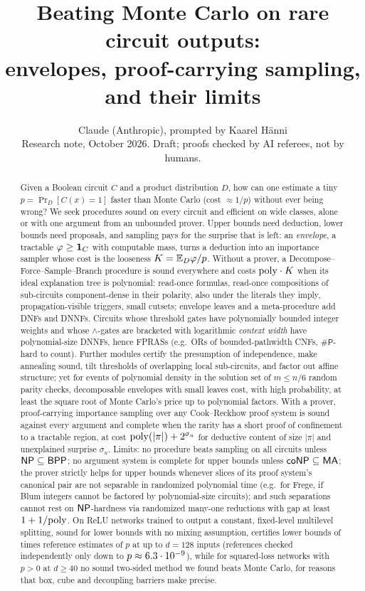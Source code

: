 \documentclass[11pt]{article}
\title{Beating Monte Carlo on rare circuit outputs:\\ envelopes, proof-carrying sampling, and their limits}
\author{Claude (Anthropic), prompted by Kaarel H\"anni\\[2pt]
\small Research note, October 2026. Draft; proofs checked by AI referees, not by humans.}
\date{}
\begin{document}
\maketitle

\begin{abstract}
Given a Boolean circuit $C$ and a product distribution $D$, how can one estimate a
tiny $p=\Pr_D[C(x)=1]$ faster than Monte Carlo (cost $\approx1/p$) without ever
being wrong? We seek procedures sound on every circuit and efficient on wide classes,
alone or with one argument from an unbounded prover. Upper bounds need deduction,
lower bounds need proposals, and sampling pays for the surprise that is left: an
\emph{envelope}, a tractable $\varphi\ge\mathbf{1}_C$ with computable mass, turns a
deduction into an importance sampler whose cost is the looseness $K=\mathbb{E}_D\varphi/p$.
Without a prover, a Decompose--Force--Sample--Branch procedure is sound everywhere and
costs $\mathrm{poly}\cdot K$ when its ideal explanation tree is polynomial: read-once formulas,
read-once compositions of sub-circuits component-dense in their polarity, also under
the literals they imply, propagation-visible triggers, small cutsets; envelope leaves and a
meta-procedure add DNFs and DNNFs.
Circuits whose threshold gates have polynomially bounded integer weights and whose
$\wedge$-gates are bracketed with logarithmic \emph{context width} have
polynomial-size DNNFs, hence FPRASs (e.g.\ ORs of bounded-pathwidth CNFs,
$\#\mathsf P$-hard to count). Further modules certify the presumption of independence,
make annealing sound, tilt thresholds of overlapping local
sub-circuits, and factor out affine structure; yet for events of polynomial density in
the solution set of $m\le n/6$ random parity checks, decomposable envelopes with small
leaves cost, with high probability, at least the square root of Monte Carlo's price up
to polynomial factors. With a prover, proof-carrying importance sampling over any
Cook--Reckhow proof system is sound against every argument and complete when the
rarity has a short proof of confinement to a tractable region, at cost
$\mathrm{poly}(|\pi|)+2^{\sigma_u}$ for deductive content of size $|\pi|$ and unexplained
surprise $\sigma_u$. Limits: no procedure beats sampling on all circuits unless
$\mathsf{NP}\subseteq\mathsf{BPP}$; no argument system is complete for upper bounds unless
$\mathsf{coNP}\subseteq\mathsf{MA}$; the prover strictly helps for upper bounds whenever slices of its
proof system's canonical pair are not separable in randomized polynomial time (e.g.\
for Frege, if Blum integers cannot be factored by polynomial-size circuits); and such
separations cannot rest on $\mathsf{NP}$-hardness via randomized many-one reductions with gap
at least $1+1/\mathrm{poly}$. On ReLU networks trained to output a constant, fixed-level multilevel
splitting, sound for lower bounds with no mixing assumption, certifies lower bounds of
\nnScaleRatio{} times reference estimates of $p$ at up to $d=128$ inputs (references
checked independently only down to $p\approx6.3\cdot10^{-9}$), while for squared-loss networks with $p>0$ at $d\ge40$ no sound
two-sided method we found beats Monte Carlo, for reasons that box, cube and decoupling
barriers make precise.
\end{abstract}

\tableofcontents














\end{document}
